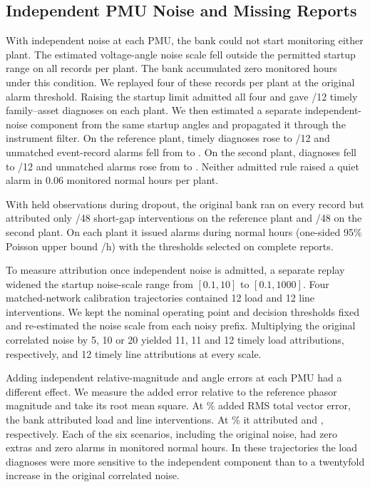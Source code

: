 \subsection{Independent PMU Noise and Missing Reports}
\label{sec:noise-stress}
With independent noise at each PMU, the bank could not start monitoring
either plant. The estimated voltage-angle noise scale fell outside the permitted
startup range on all \CThreeAuditFZeroOneNoiseParents{}
records per plant. The bank accumulated zero monitored hours under this
condition. We replayed four of these records per plant at the original
alarm threshold. Raising the startup limit admitted all four and gave
\HistRefWideExact{}/12 timely family--asset diagnoses on each plant.
We then estimated a separate independent-noise component from the
same startup angles and propagated it through the instrument filter.
On the reference plant, timely diagnoses rose to \HistRefModelExact{}/12
and unmatched event-record alarms fell from \HistRefWideExtra{} to
\HistRefModelExtra{}. On the second plant, diagnoses fell to
\HistSecondModelExact{}/12 and unmatched alarms rose from
\HistSecondWideExtra{} to \HistSecondModelExtra{}. Neither admitted
rule raised a quiet alarm in 0.06 monitored normal hours per plant.

With held observations during dropout, the original bank ran on every record
but attributed only \CThreeAuditFZeroOneDropoutShortTimely{}/48 short-gap
interventions on the reference plant and \CThreeAuditPTwoDropoutShortTimely{}/48 on the second plant.
On each plant it issued \CThreeAuditFZeroOneDropoutNormalAlarms{} alarms
during \CThreeAuditFZeroOneDropoutNormalHours{} normal hours (one-sided
95\% Poisson upper bound \CThreeAuditFZeroOneDropoutNormalUpper{}/h)
with the thresholds selected on complete reports.

To measure attribution once independent noise is admitted, a separate
replay widened the startup noise-scale range from $[0.1,10]$ to
$[0.1,1000]$. Four matched-network calibration trajectories contained
12 load and 12 line interventions. We kept the nominal operating point
and decision thresholds fixed and re-estimated the noise scale from
each noisy prefix. Multiplying the original correlated noise by 5, 10
or 20 yielded 11, 11 and 12 timely load attributions, respectively, and
12 timely line attributions at every scale.

Adding independent relative-magnitude and angle errors at each PMU had
a different effect. We measure the added error relative to the
reference phasor magnitude and take its root mean square. At \RevNoiseAddedRmsLow{}\% added RMS total vector
error, the bank attributed \RevNoiseTVEaLoad{} load and
\RevNoiseTVEaLine{} line interventions. At \RevNoiseAddedRmsHigh{}\%
it attributed \RevNoiseTVEbLoad{} and \RevNoiseTVEbLine{}, respectively.
Each of the six scenarios, including the original noise, had zero extras
and zero alarms in \RevNoiseNormalHours{} monitored normal hours. In these trajectories the load diagnoses were more sensitive to the
independent component than to a twentyfold increase in the original
correlated noise.

